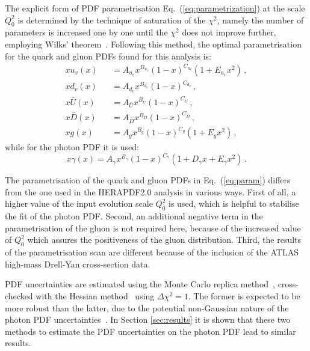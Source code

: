 The explicit form of PDF parametrisation Eq.~(\ref{eq:parametrization})
at the scale $Q_0^2$ is determined by the
technique of saturation of the $\chi^{2}$, namely the number of parameters is increased 
one by one  until the $\chi^{2}$ does not improve
further, employing Wilks' theorem~\cite{Wilks:1938dza}.
%
Following this method, the optimal parametrisation for the quark and
gluon PDFs found for this analysis is:
\begin{eqnarray}
  \nonumber
  xu_v(x) &&= A_{u_v}x^{B_{u_v}}(1-x)^{C_{u_v}}(1+E_{u_v}x^{2})\, , \\
  \nonumber
xd_v(x) &&= A_{d_v}x^{B_{d_v}}(1-x)^{C_{d_v}}\, , \\
x\bar{U}(x) &&= A_{\bar{U}}x^{B_{\bar{U}}}(1-x)^{C_{\bar{U}}}\, , \\
\nonumber
x\bar{D}(x) &&= A_{\bar{D}}x^{B_{\bar{D}}}(1-x)^{C_{\bar{D}}}\, , \\
\nonumber
\label{eq:param}
xg(x) &&= A_{g}x^{B_{g}}(1-x)^{C_{g}}(1+E_{g}x^{2})\, ,
\end{eqnarray}
while for the photon PDF it is used:
\begin{equation}
x\gamma(x) = A_{\gamma}x^{B_{\gamma}}(1-x)^{C_{\gamma}}(1+D_{\gamma}x+E_{\gamma}x^{2}) \, .
\end{equation}


The parametrisation of the quark and gluon PDFs in
Eq.~(\ref{eq:param}) differs from the one used in the HERAPDF2.0
analysis in various ways.
%
First of all, a higher value of the input evolution scale
$Q_0^2$ is used, which is helpful to stabilise the fit of the photon PDF.
%
Second, an additional negative term in the parametrisation of the
gluon is not required here, because of the increased value of $Q_0^2$
which assures the positiveness of the gluon distribution.
%
Third, the results of the parametrisation scan are different because of the
inclusion of the ATLAS high-mass Drell-Yan cross-section data.

PDF uncertainties are estimated using the Monte Carlo replica
method~\cite{DelDebbio:2004xtd,DelDebbio:2007ee,Ball:2008by},
cross-checked with
the Hessian method~\cite{Pumplin:2001ct} using $\Delta\chi^2=1$.
%
The former is expected to be more robust than the latter, due to the
potential non-Gaussian nature of the photon PDF
uncertainties~\cite{Ball:2013hta}.
%
In Section \ref{sec:results} it is shown that these two methods to estimate the PDF uncertainties
on the photon PDF lead to similar results.

